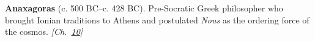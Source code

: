 \textbf{Anaxagoras} (c. 500 BC–c. 428 BC). Pre-Socratic Greek philosopher who brought Ionian traditions to Athens and postulated \emph{Nous} as the ordering force of the cosmos. \emph{[Ch.~\hyperref[ch:solarfusionquantumtunneling]{10}]}


